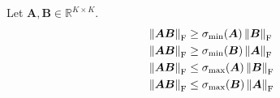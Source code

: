 \documentclass[11pt,a4paper]{article}
\begin{document}
\begin{lemma}
    \label{lemma:svd_bound}
    Let $\bm{A}, \bm{B} \in \mathbb{R}^{K \times K}$.
    \begin{align}
    &\left\lVert\bm{A} \bm{B}\right\rVert_{\rm F} \geq \sigma_{\min}(\bm{A}) \left\lVert\bm{B}\right\rVert_{\rm F} \label{eq:svd_sigma_min} \\
    &\left\lVert\bm{A} \bm{B}\right\rVert_{\rm F} \geq \sigma_{\min}(\bm{B}) \left\lVert\bm{A}\right\rVert_{\rm F} \label{eq:svd_sigma_min_2} \\
    &\left\lVert\bm{A} \bm{B}\right\rVert_{\rm F} \leq \sigma_{\max}(\bm{A}) \left\lVert\bm{B}\right\rVert_{\rm F} \label{eq:svd_sigma_max} \\
    &\left\lVert\bm{A} \bm{B}\right\rVert_{\rm F} \leq \sigma_{\max}(\bm{B}) \left\lVert\bm{A}\right\rVert_{\rm F} \label{eq:svd_sigma_max_2} 
    \end{align} 
\end{lemma}
\end{document}
